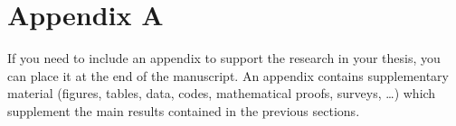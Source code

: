 \section{Appendix A}
If you need to include an appendix to support the research in your
thesis, you can place it at the end of the manuscript.  An appendix
contains supplementary material (figures, tables, data, codes,
mathematical proofs, surveys, \dots) which supplement the main results
contained in the previous sections.


